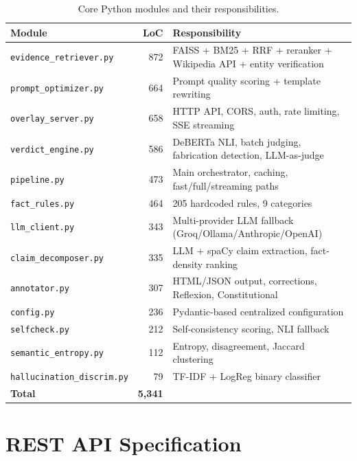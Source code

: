 \documentclass[12pt, a4paper, oneside]{report}
\begin{document}
\begin{table}[H]
\centering
\caption{Core Python modules and their responsibilities.}
\label{tab:modules}
\small
\begin{tabularx}{\textwidth}{l r X}
\toprule
\textbf{Module} & \textbf{LoC} & \textbf{Responsibility} \\
\midrule
\texttt{evidence\_retriever.py} & 872 & FAISS + BM25 + RRF + reranker + Wikipedia API + entity verification \\
\texttt{prompt\_optimizer.py} & 664 & Prompt quality scoring + template rewriting \\
\texttt{overlay\_server.py} & 658 & HTTP API, CORS, auth, rate limiting, SSE streaming \\
\texttt{verdict\_engine.py} & 586 & DeBERTa NLI, batch judging, fabrication detection, LLM-as-judge \\
\texttt{pipeline.py} & 473 & Main orchestrator, caching, fast/full/streaming paths \\
\texttt{fact\_rules.py} & 464 & 205 hardcoded rules, 9 categories \\
\texttt{llm\_client.py} & 343 & Multi-provider LLM fallback (Groq/Ollama/Anthropic/OpenAI) \\
\texttt{claim\_decomposer.py} & 335 & LLM + spaCy claim extraction, fact-density ranking \\
\texttt{annotator.py} & 307 & HTML/JSON output, corrections, Reflexion, Constitutional \\
\texttt{config.py} & 236 & Pydantic-based centralized configuration \\
\texttt{selfcheck.py} & 212 & Self-consistency scoring, NLI fallback \\
\texttt{semantic\_entropy.py} & 112 & Entropy, disagreement, Jaccard clustering \\
\texttt{hallucination\_discrim.py} & 79 & TF-IDF + LogReg binary classifier \\
\midrule
\textbf{Total} & \textbf{5,341} & \\
\bottomrule
\end{tabularx}
\end{table}

\section{REST API Specification}
\end{document}
